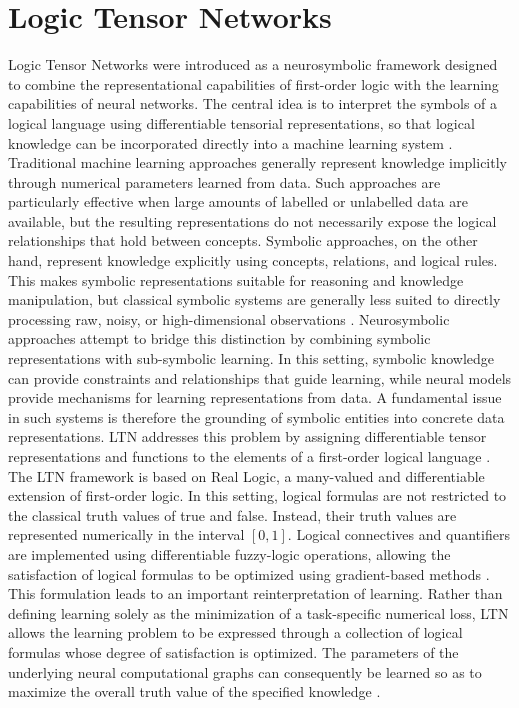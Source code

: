 \section{Logic Tensor Networks}
\label{sec:LTN}
\noindent
Logic Tensor Networks were introduced as a neurosymbolic framework designed to combine the representational capabilities of first-order logic with the learning capabilities of neural networks. The central idea is to interpret the symbols of a logical language using differentiable tensorial representations, so that logical knowledge can be incorporated directly into a machine learning system \cite{badreddine2022logic}.
Traditional machine learning approaches generally represent knowledge implicitly through numerical parameters learned from data. Such approaches are particularly effective when large amounts of labelled or unlabelled data are available, but the resulting representations do not necessarily expose the logical relationships that hold between concepts. Symbolic approaches, on the other hand, represent knowledge explicitly using concepts, relations, and logical rules. This makes symbolic representations suitable for reasoning and knowledge manipulation, but classical symbolic systems are generally less suited to directly processing raw, noisy, or high-dimensional observations \cite{badreddine2022logic}.
Neurosymbolic approaches attempt to bridge this distinction by combining symbolic representations with sub-symbolic learning. In this setting, symbolic knowledge can provide constraints and relationships that guide learning, while neural models provide mechanisms for learning representations from data. A fundamental issue in such systems is therefore the grounding of symbolic entities into concrete data representations. LTN addresses this problem by assigning differentiable tensor representations and functions to the elements of a first-order logical language \cite{badreddine2022logic}.
The LTN framework is based on Real Logic, a many-valued and differentiable extension of first-order logic. In this setting, logical formulas are not restricted to the classical truth values of true and false. Instead, their truth values are represented numerically in the interval $[0,1]$. Logical connectives and quantifiers are implemented using differentiable fuzzy-logic operations, allowing the satisfaction of logical formulas to be optimized using gradient-based methods \cite{badreddine2022logic}.
This formulation leads to an important reinterpretation of learning. Rather than defining learning solely as the minimization of a task-specific numerical loss, LTN allows the learning problem to be expressed through a collection of logical formulas whose degree of satisfaction is optimized. The parameters of the underlying neural computational graphs can consequently be learned so as to maximize the overall truth value of the specified knowledge \cite{badreddine2022logic}.
